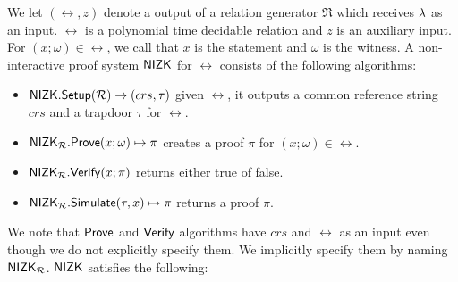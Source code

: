 
% 

We let $ (\rel,z) $ denote a output of a relation generator $ \mathfrak{R} $ which receives $ \lambda $ as an input. $ \rel $ is a polynomial time decidable relation and $ z $ is an auxiliary input. For $ (x;\omega) \in \rel $, we call that $ x$ is the statement and $ \omega $ is the witness.
A non-interactive proof system $ {\mathsf{NIZK}} $ for $\rel$ consists of the following algorithms:
\begin{itemize}
	\item ${\mathsf{NIZK}}.{\mathsf{Setup}}(\mathcal{R}) \rightarrow (crs, \tau)$  given $ \rel $, it outputs a common reference string $ crs $ and a trapdoor $ \tau $ for $ \rel $.
	\item ${\mathsf{NIZK}}_\mathcal{R}.{\mathsf{Prove}}(x; \omega) \mapsto \pi$ creates a proof $\pi$ for  $(x; \omega) \in \rel$. 
	\item ${\mathsf{NIZK}}_\mathcal{R}.{\mathsf{Verify}}(x; \pi)$ returns either true of false.
	\item $ {\mathsf{NIZK}}_\mathcal{R}.{\mathsf{Simulate}}(\tau,x) \mapsto \pi$ returns a proof $ \pi $.
\end{itemize}	
We note that $ {\mathsf{Prove}} $ and $ {\mathsf{Verify}} $ algorithms have $ crs $ and $ \rel $ as an input even though we do not explicitly specify them. We implicitly specify them by naming $ {\mathsf{NIZK}}_{\mathcal{R}} $. $ {\mathsf{NIZK}} $ satisfies the following:


